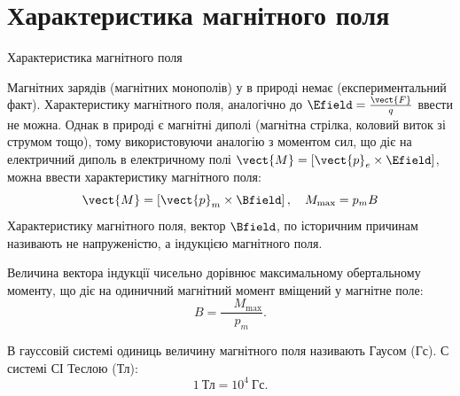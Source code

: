 \documentclass{beamer}
\begin{document}
\section{Характеристика магнітного поля}



\begin{frame}{Характеристика магнітного поля}{}
	\begin{block}{}\justifying
		Магнітних зарядів (магнітних монополів) у в природі немає (експериментальний
		факт). Характеристику магнітного поля, аналогічно до $\Efield =
			\frac{\vect{F}}{q}$ ввести не можна. Однак в природі є магнітні диполі (магнітна
		стрілка, коловий виток зі струмом тощо), тому використовуючи аналогію з моментом
		сил, що діє на електричний диполь в електричному полі $ \vect{M} =
			\left[\vect{p}_e \times\Efield\right] $, можна ввести характеристику магнітного
		поля:
		\begin{equation*}
			\vect{M} = \left[\vect{p}_m \times\Bfield\right], \quad M_{\max} = p_m B
		\end{equation*}
		Характеристику магнітного поля, вектор $\Bfield$, по історичним причинам називають
		не \alert{напруженістю}, а \alert{індукцією} магнітного поля.
	\end{block}
	\begin{overprint}
		\begin{block}{}\justifying%
			Величина вектора індукції чисельно дорівнює максимальному обертальному
			моменту, що діє на одиничний магнітний момент вміщений у магнітне поле:
			\begin{equation*}
				B = \frac{\quad M_{\max}}{p_m}.
			\end{equation*}
		\end{block}
		\begin{alertblock}{}\justifying%
			В гауссовій системі одиниць величину магнітного поля називають Гаусом (Гс). С
			системі СІ Теслою (Тл):
			\begin{equation*}
				1\ \text{Тл} = 10^4\ \text{Гс}.
			\end{equation*}
		\end{alertblock}
	\end{overprint}
\end{frame}
\end{document}
